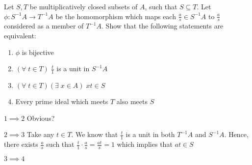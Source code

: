 \documentclass{article}
\begin{document}
\begin{problem}[8]{}
  Let $S, T$ be multiplicatively closed subsets of $A$, such that $S\subseteq T$. Let $\phi:S^{-1}A\to T^{-1}A$ be the homomorphism which maps each $\frac{a}{s}\in S^{-1}A$ to $\frac{a}{s}$ considered as a member of $T^{-1}A$. Show that the following statements are equivalent:
  \begin{enumerate}
    \item $\phi$ is bijective
    \item $(\forall\;t\in T)\;\frac{t}{1}$ is a unit in $S^{-1}A$
    \item $(\forall\;t\in T)(\exists\;x\in A)\;xt\in S$
    \item Every prime ideal which meets $T$ also meets $S$
  \end{enumerate}
\end{problem}

$1\implies 2$ Obvious?


$2\implies 3$ Take any $t\in T$. We know that $\frac{t}{1}$ is a unit in both $T^{-1}A$ and $S^{-1}A$. Hence, there exists $\frac{a}{s}$ such that $\frac{t}{1}\cdot\frac{a}{s}=\frac{at}{s}=1$ which implies that $at\in S$

$3\implies 4$ 
\end{document}
